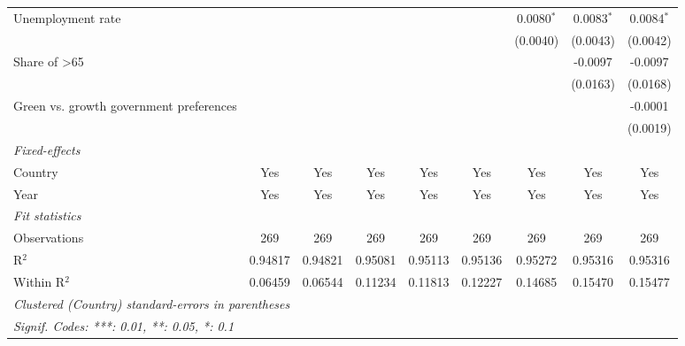\begin{table}[htbp]
\begin{tabular}{lcccccccc}
      Unemployment rate                        &               &               &                &                &               & 0.0080$^{*}$  & 0.0083$^{*}$ & 0.0084$^{*}$\\   
                                               &               &               &                &                &               & (0.0040)      & (0.0043)     & (0.0042)\\   
      Share of >65                             &               &               &                &                &               &               & -0.0097      & -0.0097\\   
                                               &               &               &                &                &               &               & (0.0163)     & (0.0168)\\   
      Green vs. growth government preferences  &               &               &                &                &               &               &              & -0.0001\\   
                                               &               &               &                &                &               &               &              & (0.0019)\\   
      \midrule
      \emph{Fixed-effects}\\
      Country                                  & Yes           & Yes           & Yes            & Yes            & Yes           & Yes           & Yes          & Yes\\  
      Year                                     & Yes           & Yes           & Yes            & Yes            & Yes           & Yes           & Yes          & Yes\\  
      \midrule
      \emph{Fit statistics}\\
      Observations                             & 269           & 269           & 269            & 269            & 269           & 269           & 269          & 269\\  
      R$^2$                                    & 0.94817       & 0.94821       & 0.95081        & 0.95113        & 0.95136       & 0.95272       & 0.95316      & 0.95316\\  
      Within R$^2$                             & 0.06459       & 0.06544       & 0.11234        & 0.11813        & 0.12227       & 0.14685       & 0.15470      & 0.15477\\  
      \midrule \midrule
      \multicolumn{9}{l}{\emph{Clustered (Country) standard-errors in parentheses}}\\
      \multicolumn{9}{l}{\emph{Signif. Codes: ***: 0.01, **: 0.05, *: 0.1}}\\
   \end{tabular}
\end{table}


